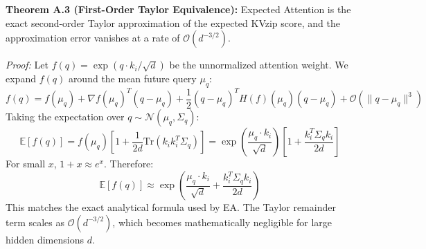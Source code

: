 \documentclass[10pt,a4paper]{article}
\begin{document}
\textbf{Theorem A.3 (First-Order Taylor Equivalence):}
Expected Attention is the exact second-order Taylor approximation of the expected KVzip score, and the approximation error vanishes at a rate of $\mathcal{O}(d^{-3/2})$.

\textit{Proof:}
Let $f(q) = \exp(q \cdot k_i / \sqrt{d})$ be the unnormalized attention weight. We expand $f(q)$ around the mean future query $\mu_q$:
\begin{equation}
f(q) = f(\mu_q) + \nabla f(\mu_q)^T (q - \mu_q) + \frac{1}{2} (q - \mu_q)^T H(f)(\mu_q) (q - \mu_q) + \mathcal{O}(\|q-\mu_q\|^3)
\end{equation}
Taking the expectation over $q \sim \mathcal{N}(\mu_q, \Sigma_q)$:
\begin{equation}
\mathbb{E}[f(q)] = f(\mu_q) \left[ 1 + \frac{1}{2d} \text{Tr}(k_i k_i^T \Sigma_q) \right] = \exp\left( \frac{\mu_q \cdot k_i}{\sqrt{d}} \right) \left[ 1 + \frac{k_i^T \Sigma_q k_i}{2d} \right]
\end{equation}
For small $x$, $1 + x \approx e^x$. Therefore:
\begin{equation}
\mathbb{E}[f(q)] \approx \exp\left( \frac{\mu_q \cdot k_i}{\sqrt{d}} + \frac{k_i^T \Sigma_q k_i}{2d} \right)
\end{equation}
This matches the exact analytical formula used by EA. The Taylor remainder term scales as $\mathcal{O}(d^{-3/2})$, which becomes mathematically negligible for large hidden dimensions $d$.
\end{document}
